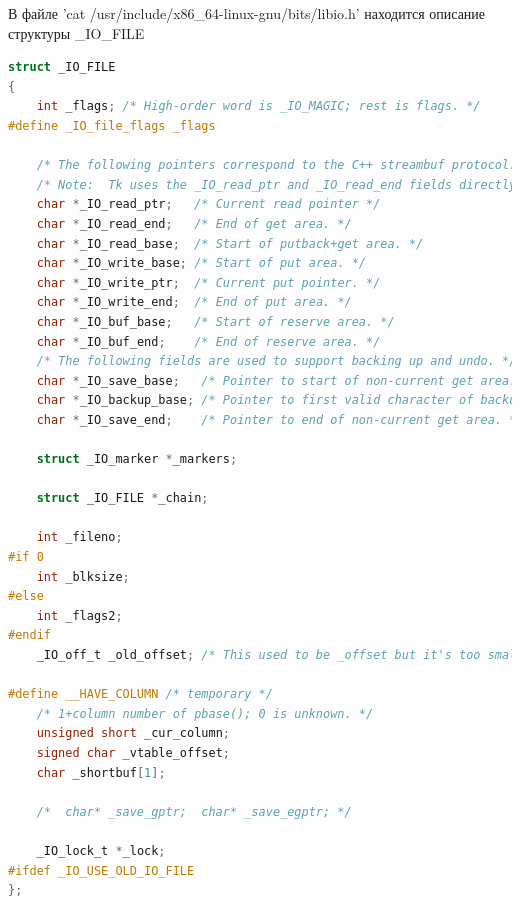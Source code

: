 \documentclass[a4paper,oneside,12pt]{extreport}
\begin{document}
\begin{task}
    В файле 'cat /usr/include/x86\_64-linux-gnu/bits/libio.h' находится описание структуры \_IO\_FILE
    \begin{lstlisting}[language=C]
struct _IO_FILE
{
    int _flags; /* High-order word is _IO_MAGIC; rest is flags. */
#define _IO_file_flags _flags

    /* The following pointers correspond to the C++ streambuf protocol. */
    /* Note:  Tk uses the _IO_read_ptr and _IO_read_end fields directly. */
    char *_IO_read_ptr;   /* Current read pointer */
    char *_IO_read_end;   /* End of get area. */
    char *_IO_read_base;  /* Start of putback+get area. */
    char *_IO_write_base; /* Start of put area. */
    char *_IO_write_ptr;  /* Current put pointer. */
    char *_IO_write_end;  /* End of put area. */
    char *_IO_buf_base;   /* Start of reserve area. */
    char *_IO_buf_end;    /* End of reserve area. */
    /* The following fields are used to support backing up and undo. */
    char *_IO_save_base;   /* Pointer to start of non-current get area. */
    char *_IO_backup_base; /* Pointer to first valid character of backup area */
    char *_IO_save_end;    /* Pointer to end of non-current get area. */

    struct _IO_marker *_markers;

    struct _IO_FILE *_chain;

    int _fileno;
#if 0
    int _blksize;
#else
    int _flags2;
#endif
    _IO_off_t _old_offset; /* This used to be _offset but it's too small.  */

#define __HAVE_COLUMN /* temporary */
    /* 1+column number of pbase(); 0 is unknown. */
    unsigned short _cur_column;
    signed char _vtable_offset;
    char _shortbuf[1];

    /*  char* _save_gptr;  char* _save_egptr; */

    _IO_lock_t *_lock;
#ifdef _IO_USE_OLD_IO_FILE
};
    \end{lstlisting}

    \newpage
    \begin{figure}[ht!]
    \end{figure}
    


\end{task}
\end{document}
